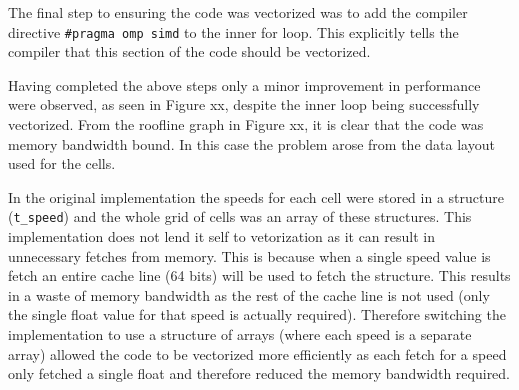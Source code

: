 \documentclass{article}
\begin{document}
\begin{multicols}{2}
The final step to ensuring the code was vectorized was to add the compiler
directive \verb|#pragma omp simd| to the inner for loop. This explicitly tells
the compiler that this section of the code should be vectorized. 

Having completed the above steps only a minor improvement in performance were
observed, as seen in Figure xx, despite the inner loop being successfully
vectorized. From the roofline graph in Figure xx, it is clear that the code was
memory bandwidth bound. In this case the problem arose from the data layout used for the cells.

In the original implementation the speeds for each cell were stored in a
structure (\verb|t_speed|) and the whole grid of cells was an array of these
structures. This implementation does not lend it self to vetorization as it
can result in unnecessary fetches from memory. This is because when a single
speed value is fetch an entire cache line (64 bits) will be used to fetch the
structure. This results in a waste of memory bandwidth as the rest of the
cache line is not used (only the single float value for that speed is actually
required). Therefore switching the implementation to use a structure of arrays
(where each speed is a separate array) allowed the code to be vectorized more
efficiently as each fetch for a speed only fetched a single float and therefore
reduced the memory bandwidth required. 

\end{multicols}
\end{document}
